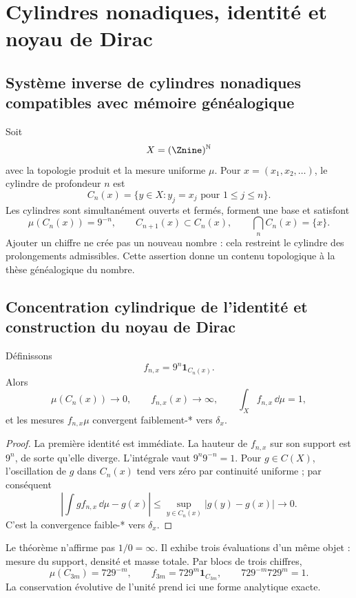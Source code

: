 \chapter{Cylindres nonadiques, identité et noyau de Dirac}

\section{Système inverse de cylindres nonadiques compatibles avec mémoire généalogique}

Soit
\[
X=(\Znine)^{\mathbb N}
\]
avec la topologie produit et la mesure uniforme \(\mu\). Pour
\(x=(x_1,x_2,\ldots)\), le cylindre de profondeur \(n\) est
\[
C_n(x)=\{y\in X:y_j=x_j\text{ pour }1\le j\le n\}.
\]
Les cylindres sont simultanément ouverts et fermés, forment une base et
satisfont
\[
\mu(C_n(x))=9^{-n},\qquad
C_{n+1}(x)\subset C_n(x),\qquad
\bigcap_n C_n(x)=\{x\}.
\]
Ajouter un chiffre ne crée pas un nouveau nombre : cela restreint le cylindre des
prolongements admissibles. Cette assertion donne un contenu topologique à la thèse
généalogique du nombre.

\section{Concentration cylindrique de l'identité et construction du noyau de Dirac}

\begin{theorem}
Définissons
\[
f_{n,x}=9^n\mathbf1_{C_n(x)}.
\]
Alors
\[
\mu(C_n(x))\to0,\qquad f_{n,x}(x)\to\infty,\qquad
\int_Xf_{n,x}\,\dd\mu=1,
\]
et les mesures \(f_{n,x}\mu\) convergent faiblement-* vers \(\delta_x\).
\end{theorem}

\begin{proof}
La première identité est immédiate. La hauteur de \(f_{n,x}\) sur son support
est \(9^n\), de sorte qu'elle diverge. L'intégrale vaut
\(9^n9^{-n}=1\). Pour \(g\in C(X)\), l'oscillation de \(g\) dans \(C_n(x)\)
tend vers zéro par continuité uniforme ; par conséquent
\[
\left|\int g f_{n,x}\,\dd\mu-g(x)\right|
\le \sup_{y\in C_n(x)}|g(y)-g(x)|\longrightarrow0.
\]
C'est la convergence faible-* vers \(\delta_x\).
\end{proof}

Le théorème n'affirme pas \(1/0=\infty\). Il exhibe trois évaluations d'un même
objet : mesure du support, densité et masse totale. Par blocs de trois chiffres,
\[
\mu(C_{3m})=729^{-m},\qquad
f_{3m}=729^m\mathbf1_{C_{3m}},\qquad
729^{-m}729^m=1.
\]
La conservation évolutive de l'unité prend ici une forme analytique exacte.

